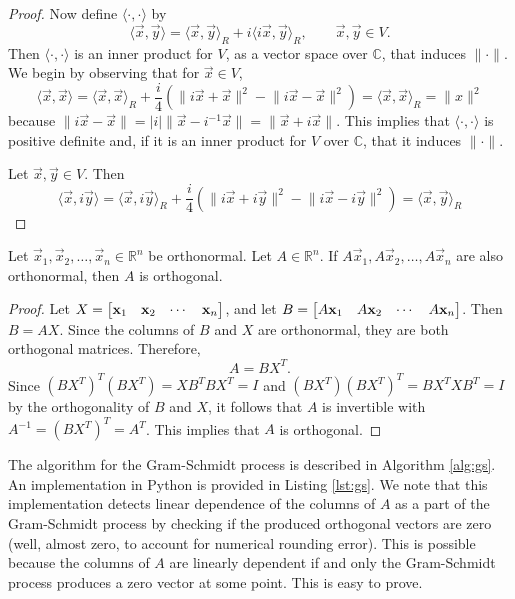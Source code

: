 \documentclass{homework}
\begin{document}
\begin{proof}
		Now define $\langle\cdot,\cdot\rangle$ by
		\begin{equation*}
			\langle\vec{x},\vec{y}\rangle = \langle\vec{x},\vec{y}\rangle_R+ i\langle i\vec{x}, \vec{y}\rangle_R, \qquad \vec{x},\vec{y}\in V.
		\end{equation*}
		Then $\langle\cdot,\cdot\rangle$ is an inner product for $V$, as a vector space over $\mathbb{C}$, that induces $\lVert\cdot\rVert$. We begin by observing that for $\vec{x} \in V$,
		\begin{equation*}
			\langle \vec{x}, \vec{x}\rangle = \langle \vec{x}, \vec{x}\rangle_R + \frac{i}{4}\left(\lVert i\vec{x} + \vec{x}\rVert^2 - \lVert i\vec{x} - \vec{x}\rVert^2\right) = \langle \vec{x},\vec{x}\rangle_R = \lVert x\rVert^2
		\end{equation*}
		because $\lVert i\vec{x} - \vec{x}\rVert = |i|\lVert\vec{x} - i^{-1}\vec{x}\rVert = \lVert \vec{x} + i\vec{x}\rVert$. This implies that $\langle \cdot,\cdot\rangle$ is positive definite and, if it is an inner product for $V$ over $\mathbb{C}$, that it induces $\lVert\cdot\rVert$.
		
		Let $\vec{x}, \vec{y} \in V$. Then
		\begin{equation*}
			\langle \vec{x}, i\vec{y}\rangle = \langle \vec{x},i\vec{y}\rangle_R + \frac{i}{4}\left(\lVert i\vec{x} + i\vec{y}\rVert^2 - \lVert i\vec{x} - i\vec{y}\rVert^2\right) = \langle\vec{x},\vec{y}\rangle_R
		\end{equation*}
	\end{proof}
	
	\question Let $\vec{x}_1,\vec{x}_2, \dots,\vec{x}_n\in\mathbb{R}^n$ be orthonormal. Let $A \in \mathbb{R}^n$. If $A\vec{x}_1, A\vec{x}_2,\dots, A\vec{x}_n$ are also orthonormal, then $A$ is orthogonal.
	
	\begin{proof}
		Let $X = \left[\begin{matrix}\mathbf{x}_1 & \mathbf{x}_2 & \cdots & \mathbf{x}_n\end{matrix}\right]$, and let $B = \left[\begin{matrix}A\mathbf{x}_1 & A\mathbf{x}_2 & \cdots & A\mathbf{x}_n\end{matrix}\right]$. Then $B = AX$. Since the columns of $B$ and $X$ are orthonormal, they are both orthogonal matrices. Therefore,
		\begin{equation*}
			A = BX^T.
		\end{equation*}
		Since $(BX^T)^T(BX^T) = XB^TBX^T = I$ and $(BX^T)(BX^T)^T = BX^TXB^T = I$ by the orthogonality of $B$ and $X$, it follows that $A$ is invertible with $A^{-1} = (BX^T)^T = A^T$. This implies that $A$ is orthogonal.
	\end{proof}
	
	\question The algorithm for the Gram-Schmidt process is described in Algorithm \ref{alg:gs}. An implementation in Python is provided in Listing \ref{lst:gs}. We note that this implementation detects linear dependence of the columns of $A$ as a part of the Gram-Schmidt process by checking if the produced orthogonal vectors are zero (well, almost zero, to account for numerical rounding error). This is possible because the columns of $A$ are linearly dependent if and only the Gram-Schmidt process produces a zero vector at some point. This is easy to prove.
	
\end{document}
